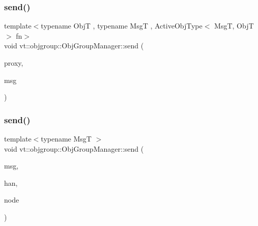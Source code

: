 \subsubsection{\texorpdfstring{send()}{send()}\hspace{0.1cm}{\footnotesize\ttfamily [1/2]}}
{\footnotesize\ttfamily template$<$typename ObjT , typename MsgT , Active\+Obj\+Type$<$ Msg\+T, Obj\+T $>$ fn$>$ \\
void vt\+::objgroup\+::\+Obj\+Group\+Manager\+::send (\begin{DoxyParamCaption}\item[{\hyperlink{structvt_1_1objgroup_1_1_obj_group_manager_adba6c8ecb0f4c30e719f1abb995cfc9b}{Proxy\+Elm\+Type}$<$ ObjT $>$}]{proxy,  }\item[{\hyperlink{namespacevt_ab2b3d506ec8e8d1540aede826d84a239}{Msg\+Shared\+Ptr}$<$ MsgT $>$}]{msg }\end{DoxyParamCaption})}

\mbox{\label{structvt_1_1objgroup_1_1_obj_group_manager_a58abda8b7d1372bea7ca061402e69c75}} 
\subsubsection{\texorpdfstring{send()}{send()}\hspace{0.1cm}{\footnotesize\ttfamily [2/2]}}
{\footnotesize\ttfamily template$<$typename MsgT $>$ \\
void vt\+::objgroup\+::\+Obj\+Group\+Manager\+::send (\begin{DoxyParamCaption}\item[{\hyperlink{namespacevt_ab2b3d506ec8e8d1540aede826d84a239}{Msg\+Shared\+Ptr}$<$ MsgT $>$}]{msg,  }\item[{\hyperlink{namespacevt_af64846b57dfcaf104da3ef6967917573}{Handler\+Type}}]{han,  }\item[{\hyperlink{namespacevt_a866da9d0efc19c0a1ce79e9e492f47e2}{Node\+Type}}]{node }\end{DoxyParamCaption})}

\mbox{\label{structvt_1_1objgroup_1_1_obj_group_manager_a922a82ded79fdefb5fd7de60bde77aad}} 
